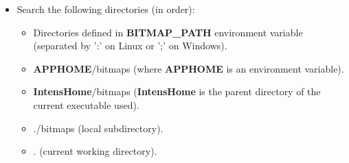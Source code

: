 \begin{itemize}
\item Search the following directories (in order):
  \begin{itemize}
  \item Directories defined in {\bfseries BITMAP\_PATH} environment variable
  (separated by ':' on Linux or ';' on Windows).
  \item {\bfseries APPHOME}/bitmaps
  (where {\bfseries APPHOME} is an environment variable).
  \item {\bfseries IntensHome}/bitmaps
  ({\bfseries IntensHome} is the parent directory of the current \INTENS{} executable used).
  \item ./bitmaps (local subdirectory).
  \item . (current working directory).
  \end{itemize}

\end{itemize}
